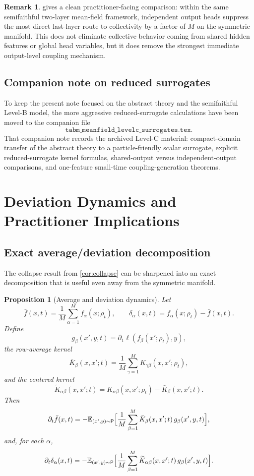 \documentclass[11pt]{article}
\newtheorem{proposition}[theorem]{Proposition}
\theoremstyle{definition}
\newtheorem{remark}[theorem]{Remark}
\newcommand{\E}{\mathbb{E}}
\begin{document}
\begin{remark}
 gives a clean practitioner-facing comparison:
within the same semifaithful two-layer mean-field framework, independent output heads suppress the most direct last-layer route to collectivity by a factor of $M$ on the symmetric manifold.
This does not eliminate collective behavior coming from shared hidden features or global head variables,
but it does remove the strongest immediate output-level coupling mechanism.
\end{remark}

\subsection{Companion note on reduced surrogates}

To keep the present note focused on the abstract theory and the semifaithful Level-B model, the more aggressive reduced-surrogate calculations have been moved to the companion file
\[
  \texttt{tabm\_meanfield\_levelc\_surrogates.tex}.
\]
That companion note records the archived Level-C material:
compact-domain transfer of the abstract theory to a particle-friendly scalar surrogate,
explicit reduced-surrogate kernel formulas,
shared-output versus independent-output comparisons,
and one-feature small-time coupling-generation theorems.

\section{Deviation Dynamics and Practitioner Implications}

\subsection{Exact average/deviation decomposition}

The collapse result from \cref{cor:collapse} can be sharpened into an exact decomposition that is useful even away from the symmetric manifold.

\begin{proposition}[Average and deviation dynamics]
\label{prop:deviation}
Let
\[
  \bar f(x,t)=\frac1M \sum_{\alpha=1}^M f_\alpha(x;\rho_t),
  \qquad
  \delta_\alpha(x,t)=f_\alpha(x;\rho_t)-\bar f(x,t).
\]
Define
\[
  g_\beta(x',y,t)=\partial_1 \ell(f_\beta(x';\rho_t),y),
\]
the row-average kernel
\[
  \bar K_\beta(x,x';t)=\frac1M \sum_{\gamma=1}^M K_{\gamma\beta}(x,x';\rho_t),
\]
and the centered kernel
\[
  \widetilde K_{\alpha\beta}(x,x';t)=K_{\alpha\beta}(x,x';\rho_t)-\bar K_\beta(x,x';t).
\]
Then
\begin{equation}
  \partial_t \bar f(x,t)
  =
  -
  \E_{(x',y)\sim \mathsf{P}}
  \Bigl[
    \frac1M \sum_{\beta=1}^M
    \bar K_\beta(x,x';t)\, g_\beta(x',y,t)
  \Bigr],
  \label{eq:avgdyn}
\end{equation}
and, for each $\alpha$,
\begin{equation}
  \partial_t \delta_\alpha(x,t)
  =
  -
  \E_{(x',y)\sim \mathsf{P}}
  \Bigl[
    \frac1M \sum_{\beta=1}^M
    \widetilde K_{\alpha\beta}(x,x';t)\, g_\beta(x',y,t)
  \Bigr].
  \label{eq:devdyn}
\end{equation}
\end{proposition}
\end{document}
